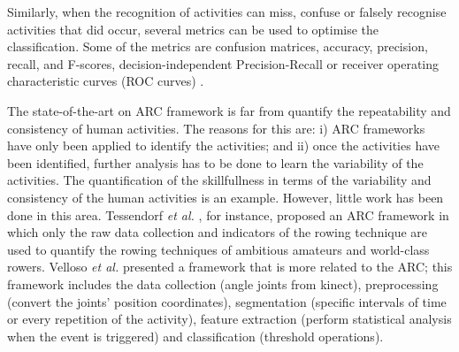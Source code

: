 \documentclass[10pt,journal,compsoc]{IEEEtran}
\begin{document}
% 
Similarly, when the recognition of activities can miss, confuse or falsely
recognise activities that did occur, several metrics
can be used to optimise the classification. Some of the metrics
are confusion matrices, accuracy, precision, recall, and F-scores,
decision-independent Precision-Recall or receiver operating characteristic
curves (ROC curves) \cite{bulling2014}.

The state-of-the-art on ARC framework is far from quantify the repeatability and 
consistency of human activities. The reasons for this are:
i) ARC frameworks have only been applied to identify the activities;
and ii) once the activities have been identified, 
further analysis has to be done to learn the variability of the activities. 
The quantification of the skillfullness in terms of the variability and consistency 
of the human activities is an example.
However, little work has been done in this area.
Tessendorf \emph{et al.} \cite{Tessendorf2011}, for instance,
proposed an ARC framework in which only the raw data collection and indicators of the
rowing technique are used to quantify the rowing techniques of ambitious amateurs and world-class rowers. 
Velloso \emph{et al.} \cite{Velloso2013a, Velloso2013b} 
presented a framework that is more related to the ARC;
this framework includes the data collection (angle joints from kinect),
preprocessing (convert the joints' position coordinates),
segmentation (specific intervals of time or every repetition of the activity),
feature extraction (perform statistical analysis when the event is triggered)
and classification (threshold operations).
% 
% 
% 
% 
% 
\end{document}
